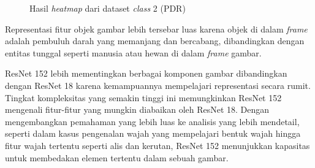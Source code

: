 \begin{figure}[H]
	\centering
	\caption{Hasil \emph{heatmap} dari dataset \emph{class} 2 (PDR)}
	\label{fig:GRAD2}
\end{figure}

Representasi fitur objek gambar lebih tersebar luas karena objek di dalam \emph{frame} adalah pembuluh darah yang memanjang dan bercabang, dibandingkan dengan entitas tunggal seperti manusia atau hewan di dalam \emph{frame} gambar.

ResNet 152 lebih mementingkan berbagai komponen gambar dibandingkan dengan ResNet 18 karena kemampuannya mempelajari representasi secara rumit. Tingkat kompleksitas yang semakin tinggi ini memungkinkan ResNet 152 mengenali fitur-fitur yang mungkin diabaikan oleh ResNet 18. Dengan mengembangkan pemahaman yang lebih luas ke analisis yang lebih mendetail, seperti dalam kasus pengenalan wajah yang mempelajari bentuk wajah hingga fitur wajah tertentu seperti alis dan kerutan, ResNet 152 menunjukkan kapasitas untuk membedakan elemen tertentu dalam sebuah gambar.